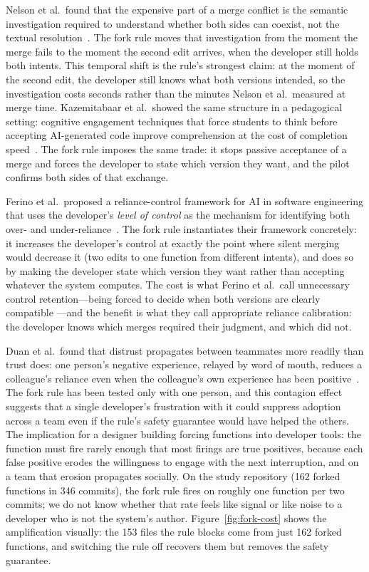 Nelson et al.\ found that the expensive part of a merge conflict is the
semantic investigation required to understand whether both sides can
coexist, not the textual resolution~\cite{nelson2019}. The fork rule moves
that investigation from the moment the merge fails to the moment the second
edit arrives, when the developer still holds both intents. This temporal shift
is the rule's strongest claim: at the moment of the second edit, the developer
still knows what both versions intended, so the investigation costs seconds
rather than the minutes Nelson et al.\ measured at merge time.
Kazemitabaar et al.\ showed the same structure in a pedagogical setting:
cognitive engagement techniques that force students to think before accepting
AI-generated code improve comprehension at the cost of completion
speed~\cite{kazemitabaar2025}. The fork rule imposes the same trade: it stops
passive acceptance of a merge and forces the developer to state which version
they want, and the pilot confirms both sides of that exchange.

Ferino et al.\ proposed a reliance-control framework for AI in software
engineering that uses the developer's \emph{level of control} as the
mechanism for identifying both over- and under-reliance~\cite{ferino2026}.
The fork rule instantiates their framework concretely: it increases the
developer's control at exactly the point where silent merging would decrease
it (two edits to one function from different intents), and does so by making
the developer state which version they want rather than accepting whatever
the system computes. The cost is what Ferino et al.\ call unnecessary control
retention---being forced to decide when both versions are clearly compatible
---and the benefit is what they call appropriate reliance calibration: the
developer knows which merges required their judgment, and which did not.

Duan et al.\ found that distrust propagates between teammates more readily
than trust does: one person's negative experience, relayed by word of mouth,
reduces a colleague's reliance even when the colleague's own experience has
been positive~\cite{duan2026}. The fork rule has been tested only with one
person, and this contagion effect suggests that a single developer's
frustration with it could suppress adoption across a team even if the rule's
safety guarantee would have helped the others. The implication for a designer
building forcing functions into developer tools: the function must fire rarely
enough that most firings are true positives, because each false positive erodes
the willingness to engage with the next interruption, and on a team that
erosion propagates socially. On the study repository (162 forked functions in
346 commits), the fork rule fires on roughly one function per two commits; we
do not know whether that rate feels like signal or like noise to a developer
who is not the system's author. Figure~\ref{fig:fork-cost} shows the
amplification visually: the 153 files the rule blocks come from just 162
forked functions, and switching the rule off recovers them but removes the
safety guarantee.

